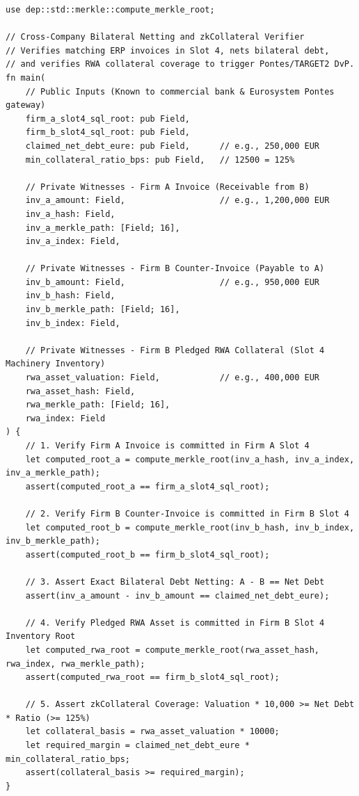 \documentclass[a4paper,11pt,twoside,parskip=half-,headings=small]{scrartcl}
\newcommand{\code}[1]{\texttt{#1}}
\begin{document}
\begin{lstlisting}[language=Noir,caption={Noir Circuit: Cross-Company Bilateral Netting and zkCollateral Verification (\code{circuits/src/cross\_company\_netting\_collateral.nr})}]
use dep::std::merkle::compute_merkle_root;

// Cross-Company Bilateral Netting and zkCollateral Verifier
// Verifies matching ERP invoices in Slot 4, nets bilateral debt,
// and verifies RWA collateral coverage to trigger Pontes/TARGET2 DvP.
fn main(
    // Public Inputs (Known to commercial bank & Eurosystem Pontes gateway)
    firm_a_slot4_sql_root: pub Field,
    firm_b_slot4_sql_root: pub Field,
    claimed_net_debt_eure: pub Field,      // e.g., 250,000 EUR
    min_collateral_ratio_bps: pub Field,   // 12500 = 125%

    // Private Witnesses - Firm A Invoice (Receivable from B)
    inv_a_amount: Field,                   // e.g., 1,200,000 EUR
    inv_a_hash: Field,
    inv_a_merkle_path: [Field; 16],
    inv_a_index: Field,

    // Private Witnesses - Firm B Counter-Invoice (Payable to A)
    inv_b_amount: Field,                   // e.g., 950,000 EUR
    inv_b_hash: Field,
    inv_b_merkle_path: [Field; 16],
    inv_b_index: Field,

    // Private Witnesses - Firm B Pledged RWA Collateral (Slot 4 Machinery Inventory)
    rwa_asset_valuation: Field,            // e.g., 400,000 EUR
    rwa_asset_hash: Field,
    rwa_merkle_path: [Field; 16],
    rwa_index: Field
) {
    // 1. Verify Firm A Invoice is committed in Firm A Slot 4
    let computed_root_a = compute_merkle_root(inv_a_hash, inv_a_index, inv_a_merkle_path);
    assert(computed_root_a == firm_a_slot4_sql_root);

    // 2. Verify Firm B Counter-Invoice is committed in Firm B Slot 4
    let computed_root_b = compute_merkle_root(inv_b_hash, inv_b_index, inv_b_merkle_path);
    assert(computed_root_b == firm_b_slot4_sql_root);

    // 3. Assert Exact Bilateral Debt Netting: A - B == Net Debt
    assert(inv_a_amount - inv_b_amount == claimed_net_debt_eure);

    // 4. Verify Pledged RWA Asset is committed in Firm B Slot 4 Inventory Root
    let computed_rwa_root = compute_merkle_root(rwa_asset_hash, rwa_index, rwa_merkle_path);
    assert(computed_rwa_root == firm_b_slot4_sql_root);

    // 5. Assert zkCollateral Coverage: Valuation * 10,000 >= Net Debt * Ratio (>= 125%)
    let collateral_basis = rwa_asset_valuation * 10000;
    let required_margin = claimed_net_debt_eure * min_collateral_ratio_bps;
    assert(collateral_basis >= required_margin);
}
\end{lstlisting}
\end{document}
